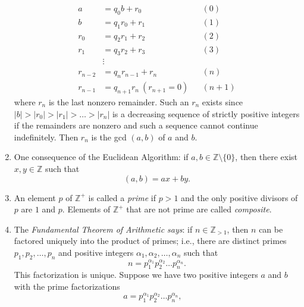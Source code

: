 \begin{enumerate}[(1)]
    \begin{align*}
        a&=q_0b+r_0&&(0)\\
        b&=q_1r_0+r_1&&(1)\\
        r_0&=q_2r_1+r_2&&(2)\\
        r_1&=q_3r_2+r_3&&(3)\\
        &\vdots\\
        r_{n-2}&=q_nr_{n-1}+r_n&&(n)\\
        r_{n-1}&=q_{n+1}r_{n}\ (r_{n+1}=0)&&(n+1)
    \end{align*}
    where $r_n$ is the last nonzero remainder.
    Such an $r_n$ exists since $|b|>|r_0|>|r_1|>\dots>|r_n|$ is a decreasing sequence of strictly positive integers if the remainders are nonzero and such a sequence cannot continue indefinitely.
    Then $r_n$ is the gcd $(a,b)$ of $a$ and $b$.
    \item One consequence of the Euclidean Algorithm:
    if $a,b\in\mathbb{Z}\setminus\{0\}$, then there exist $x,y\in\mathbb{Z}$ such that 
    \[
        (a,b)=ax+by.
    \]
    \item An element $p$ of $\mathbb{Z}^+$ is called a \textit{prime} if $p>1$ and the only positive divisors of $p$ are $1$ and $p$.
    Elements of $\mathbb{Z}^+$ that are not prime are called \textit{composite}.
    \item The \textit{Fundamental Theorem of Arithmetic says}:
    if $n\in\mathbb{Z}_{>1}$, then $n$ can be factored uniquely into the product of primes;
    i.e., there are distinct primes $p_1,p_2,\dots,p_n$ and positive integers $\alpha_1,\alpha_2,\dots,\alpha_n$ such that 
    \[
        n=p_1^{\alpha_1}p_2^{\alpha_2}\dots p_n^{\alpha_n}.
    \]
    This factorization is unique.
    Suppose we have two positive integers $a$ and $b$ with the prime factorizations
    \[
        a=p_1^{\alpha_1}p_2^{\alpha_2}\dots p_n^{\alpha_n},\quad 
\]
\end{enumerate}
